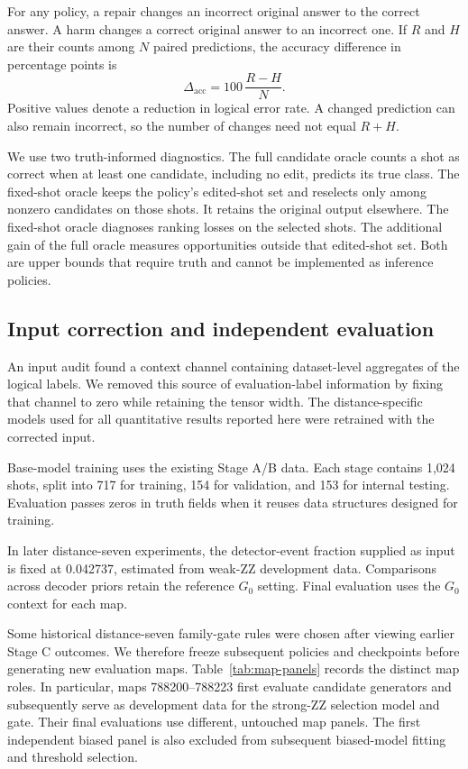 \documentclass[aps,prd,12pt,twocolumn,superscriptaddress,floatfix]{revtex4-2}
\begin{document}
For any policy, a repair changes an incorrect original answer to the correct answer. A harm changes a correct original answer to an incorrect one. If \(R\) and \(H\) are their counts among \(N\) paired predictions, the accuracy difference in percentage points is
\begin{equation}
\Delta_{\mathrm{acc}}=100\,\frac{R-H}{N}.
\label{eq:net-gain}
\end{equation}
Positive values denote a reduction in logical error rate. A changed prediction can also remain incorrect, so the number of changes need not equal \(R+H\).

We use two truth-informed diagnostics. The full candidate oracle counts a shot as correct when at least one candidate, including no edit, predicts its true class. The fixed-shot oracle keeps the policy's edited-shot set and reselects only among nonzero candidates on those shots. It retains the original output elsewhere. The fixed-shot oracle diagnoses ranking losses on the selected shots. The additional gain of the full oracle measures opportunities outside that edited-shot set. Both are upper bounds that require truth and cannot be implemented as inference policies.

\subsection{Input correction and independent evaluation}

An input audit found a context channel containing dataset-level aggregates of the logical labels. We removed this source of evaluation-label information by fixing that channel to zero while retaining the tensor width. The distance-specific models used for all quantitative results reported here were retrained with the corrected input.

Base-model training uses the existing Stage A/B data. Each stage contains 1,024 shots, split into 717 for training, 154 for validation, and 153 for internal testing. Evaluation passes zeros in truth fields when it reuses data structures designed for training.

In later distance-seven experiments, the detector-event fraction supplied as input is fixed at 0.042737, estimated from weak-ZZ development data. Comparisons across decoder priors retain the reference \(G_0\) setting. Final evaluation uses the \(G_0\) context for each map.

Some historical distance-seven family-gate rules were chosen after viewing earlier Stage C outcomes. We therefore freeze subsequent policies and checkpoints before generating new evaluation maps. Table~\ref{tab:map-panels} records the distinct map roles. In particular, maps 788200--788223 first evaluate candidate generators and subsequently serve as development data for the strong-ZZ selection model and gate. Their final evaluations use different, untouched map panels. The first independent biased panel is also excluded from subsequent biased-model fitting and threshold selection.
\end{document}
